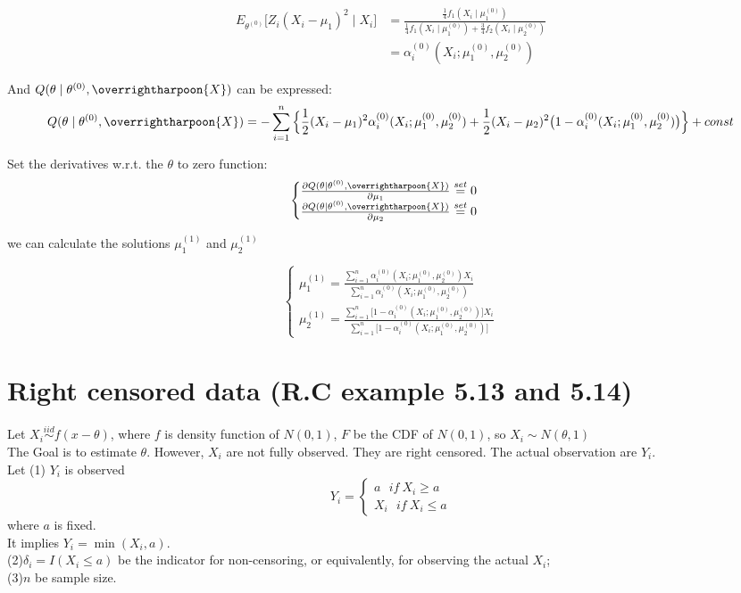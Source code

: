 \documentclass[
  14pt,
]{article}
\begin{document}
\[
\begin{aligned}
E_{\theta^{(0)}}\big[Z_i(X_i-\mu_1)^2\mid X_i\big]&=\frac{\frac{1}{4}f_1(X_i\mid \mu_1^{(0)})}{\frac{1}{4}f_1(X_i\mid\mu_1^{(0)})+\frac{3}{4}f_2(X_i\mid\mu_2^{(0)})}\\
&=\alpha_i^{(0)}(X_i;\mu_1^{(0)},\mu_2^{(0)})
\end{aligned}
\]

And \(Q(\theta\mid\theta^{(0)},\overrightharpoon{X})\) can be expressed:
\[
Q(\theta\mid\theta^{(0)},\overrightharpoon{X})=-\sum\limits_{i=1}^{n}\Big\{\frac{1}{2}(X_i-\mu_1)^2\alpha_i^{(0)}(X_i;\mu_1^{(0)},\mu_2^{(0)})+\frac{1}{2}(X_i-\mu_2)^2\big(1-\alpha_i^{(0)}(X_i;\mu_1^{(0)},\mu_2^{(0)})\big)\Big\}+const
\]

Set the derivatives w.r.t. the \(\theta\) to zero function: \[
\begin{cases}
\frac{\partial Q(\theta\mid\theta^{(0)},\overrightharpoon{X})}{\partial \mu_1}\overset{set}{=}0\\
\frac{\partial Q(\theta\mid\theta^{(0)},\overrightharpoon{X})}{\partial \mu_2}\overset{set}{=}0
\end{cases}
\]

we can calculate the solutions \(\mu_1^{(1)}\) and \(\mu_2^{(1)}\)

\[
\begin{cases}
\mu_1^{(1)}=\frac{\sum\limits_{i=1}^{n}\alpha_i^{(0)}(X_i;\mu_1^{(0)},\mu_2^{(0)})X_i}{\sum\limits_{i=1}^{n}\alpha_i^{(0)}(X_i;\mu_1^{(0)},\mu_2^{(0)})}\\
\mu_2^{(1)}=\frac{\sum\limits_{i=1}^{n}\big[1-\alpha_i^{(0)}(X_i;\mu_1^{(0)},\mu_2^{(0)})\big]X_i}{\sum\limits_{i=1}^{n}\big[1-\alpha_i^{(0)}(X_i;\mu_1^{(0)},\mu_2^{(0)})\big]}
\end{cases}
\]

\hypertarget{right-censored-data-r.c-example-5.13-and-5.14}{%
\section{Right censored data (R.C example 5.13 and
5.14)}\label{right-censored-data-r.c-example-5.13-and-5.14}}

Let \(X_i\overset{iid}{\sim}f(x-\theta)\), where \(f\) is density
function of \(N(0,1)\), \(F\) be the CDF of \(N(0,1)\), so
\(X_i\sim N(\theta,1)\)\\
The Goal is to estimate \(\theta\). However, \(X_i\) are not fully
observed. They are right censored. The actual observation are \(Y_i\).\\
Let (1) \(Y_i\) is observed \[ 
Y_i=
\begin{cases}
a \ \ \ if \ X_i\ge a \\
X_i \ \ \ if \ X_i\le a
\end{cases}
\] where \(a\) is fixed.\\
It implies \(Y_i=\min(X_i,a)\).\\
(2)\(\delta_i=I(X_i\le a)\) be the indicator for non-censoring, or
equivalently, for observing the actual \(X_i\);\\
(3)\(n\) be sample size.
\end{document}
